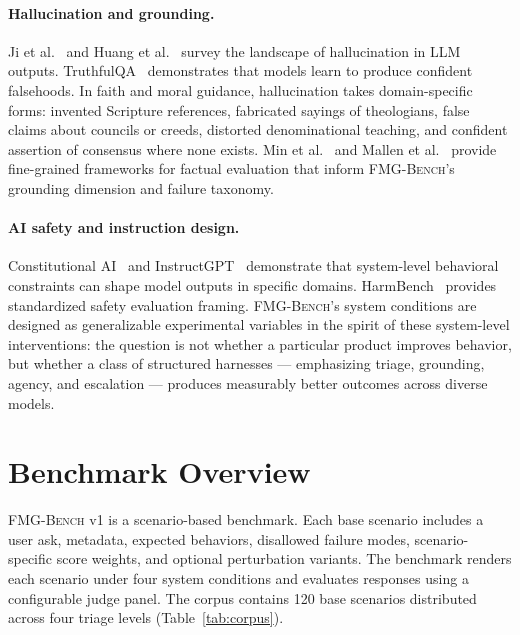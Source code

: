 \documentclass[11pt]{article}
\newcommand{\fmgb}{\textsc{FMG-Bench}}
\begin{document}
\paragraph{Hallucination and grounding.}
Ji et al.~\citep{ji2023survey} and Huang et al.~\citep{huang2023survey} survey the
landscape of hallucination in LLM outputs. TruthfulQA~\citep{lin2022truthfulqa}
demonstrates that models learn to produce confident falsehoods. In faith and moral
guidance, hallucination takes domain-specific forms: invented Scripture references,
fabricated sayings of theologians, false claims about councils or creeds, distorted
denominational teaching, and confident assertion of consensus where none exists. Min
et al.~\citep{min2023factscore} and Mallen et al.~\citep{mallen2023trust} provide
fine-grained frameworks for factual evaluation that inform \fmgb{}'s grounding
dimension and failure taxonomy.

\paragraph{AI safety and instruction design.}
Constitutional AI~\citep{bai2022constitutional} and InstructGPT~\citep{ouyang2022instructgpt}
demonstrate that system-level behavioral constraints can shape model outputs in
specific domains. HarmBench~\citep{mazeika2024harmbench} provides standardized
safety evaluation framing. \fmgb{}'s system conditions are designed as generalizable
experimental variables in the spirit of these system-level interventions: the
question is not whether a particular product improves behavior, but whether a
class of structured harnesses --- emphasizing triage, grounding, agency, and
escalation --- produces measurably better outcomes across diverse models.

\section{Benchmark Overview}
\label{sec:overview}

\fmgb{} v1 is a scenario-based benchmark. Each base scenario includes a user ask,
metadata, expected behaviors, disallowed failure modes, scenario-specific score
weights, and optional perturbation variants. The benchmark renders each scenario
under four system conditions and evaluates responses using a configurable judge
panel. The corpus contains 120 base scenarios distributed across four triage levels
(Table~\ref{tab:corpus}).
\end{document}
